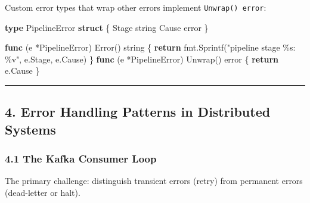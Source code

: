 \documentclass[
]{article}
\newenvironment{Shaded}{}{}
\newcommand{\ControlFlowTok}[1]{\textcolor[rgb]{0.00,0.44,0.13}{\textbf{#1}}}
\newcommand{\DataTypeTok}[1]{\textcolor[rgb]{0.56,0.13,0.00}{#1}}
\newcommand{\KeywordTok}[1]{\textcolor[rgb]{0.00,0.44,0.13}{\textbf{#1}}}
\newcommand{\NormalTok}[1]{#1}
\newcommand{\OperatorTok}[1]{\textcolor[rgb]{0.40,0.40,0.40}{#1}}
\newcommand{\StringTok}[1]{\textcolor[rgb]{0.25,0.44,0.63}{#1}}
\begin{document}
Custom error types that wrap other errors implement
\texttt{Unwrap()\ error}:

\begin{Shaded}
\begin{Highlighting}[]
\KeywordTok{type}\NormalTok{ PipelineError }\KeywordTok{struct} \OperatorTok{\{}
\NormalTok{    Stage }\DataTypeTok{string}
\NormalTok{    Cause }\DataTypeTok{error}
\OperatorTok{\}}

\KeywordTok{func} \OperatorTok{(}\NormalTok{e }\OperatorTok{*}\NormalTok{PipelineError}\OperatorTok{)}\NormalTok{ Error}\OperatorTok{()} \DataTypeTok{string}  \OperatorTok{\{} \ControlFlowTok{return}\NormalTok{ fmt}\OperatorTok{.}\NormalTok{Sprintf}\OperatorTok{(}\StringTok{"pipeline stage \%s: \%v"}\OperatorTok{,}\NormalTok{ e}\OperatorTok{.}\NormalTok{Stage}\OperatorTok{,}\NormalTok{ e}\OperatorTok{.}\NormalTok{Cause}\OperatorTok{)} \OperatorTok{\}}
\KeywordTok{func} \OperatorTok{(}\NormalTok{e }\OperatorTok{*}\NormalTok{PipelineError}\OperatorTok{)}\NormalTok{ Unwrap}\OperatorTok{()} \DataTypeTok{error}  \OperatorTok{\{} \ControlFlowTok{return}\NormalTok{ e}\OperatorTok{.}\NormalTok{Cause }\OperatorTok{\}}
\end{Highlighting}
\end{Shaded}

\begin{center}\rule{0.5\linewidth}{0.5pt}\end{center}

\hypertarget{error-handling-patterns-in-distributed-systems}{%
\subsection{4. Error Handling Patterns in Distributed
Systems}\label{error-handling-patterns-in-distributed-systems}}

\hypertarget{the-kafka-consumer-loop}{%
\subsubsection{4.1 The Kafka Consumer
Loop}\label{the-kafka-consumer-loop}}

The primary challenge: distinguish transient errors (retry) from
permanent errors (dead-letter or halt).
\end{document}
